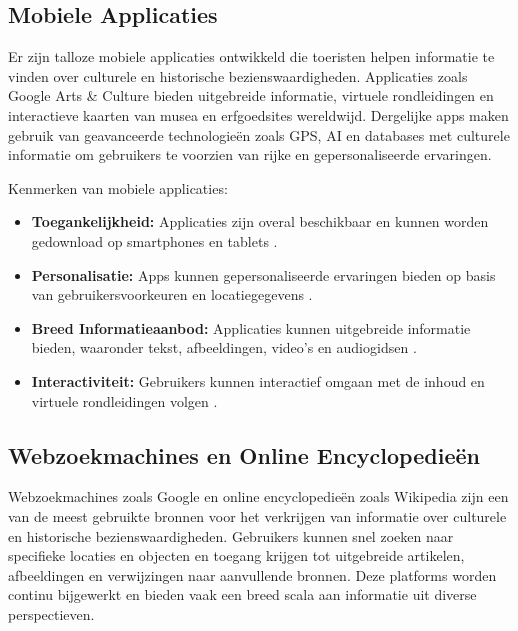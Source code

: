 \subsection{Mobiele Applicaties}
Er zijn talloze mobiele applicaties ontwikkeld die toeristen helpen informatie te vinden over culturele en historische bezienswaardigheden. Applicaties zoals Google Arts \& Culture bieden uitgebreide informatie, virtuele rondleidingen en interactieve kaarten van musea en erfgoedsites wereldwijd. Dergelijke apps maken gebruik van geavanceerde technologieën zoals GPS, AI en databases met culturele informatie om gebruikers te voorzien van rijke en gepersonaliseerde ervaringen.

Kenmerken van mobiele applicaties:
\begin{itemize}
    \item \textbf{Toegankelijkheid:} Applicaties zijn overal beschikbaar en kunnen worden gedownload op smartphones en tablets \autocite{morrison2012mobile}.
    \item \textbf{Personalisatie:} Apps kunnen gepersonaliseerde ervaringen bieden op basis van gebruikersvoorkeuren en locatiegegevens \autocite{kim2013empirical}.
    \item \textbf{Breed Informatieaanbod:} Applicaties kunnen uitgebreide informatie bieden, waaronder tekst, afbeeldingen, video's en audiogidsen \autocite{wa2015analysis}.
    \item \textbf{Interactiviteit:} Gebruikers kunnen interactief omgaan met de inhoud en virtuele rondleidingen volgen \autocite{jung2015role}.
\end{itemize}

\subsection{Webzoekmachines en Online Encyclopedieën}
Webzoekmachines zoals Google en online encyclopedieën zoals Wikipedia zijn een van de meest gebruikte bronnen voor het verkrijgen van informatie over culturele en historische bezienswaardigheden. Gebruikers kunnen snel zoeken naar specifieke locaties en objecten en toegang krijgen tot uitgebreide artikelen, afbeeldingen en verwijzingen naar aanvullende bronnen. Deze platforms worden continu bijgewerkt en bieden vaak een breed scala aan informatie uit diverse perspectieven.

